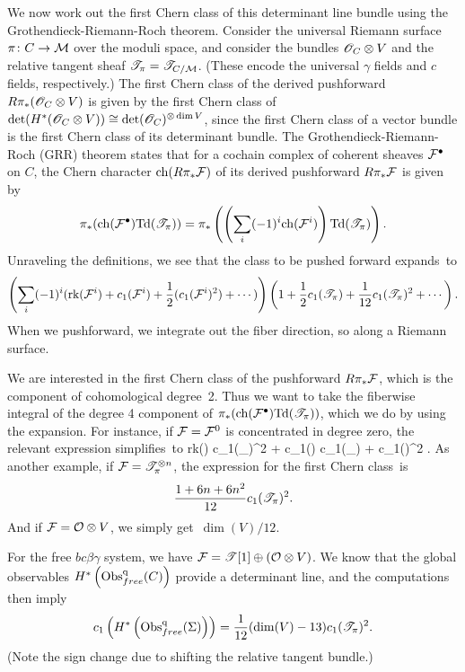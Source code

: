 We now work out the first Chern class of this determinant line bundle using the Grothendieck-Riemann-Roch theorem.
Consider the universal Riemann surface $\pi \colon C \to \mathcal M$ over the moduli space, 
and consider the bundles $\mathscr O_C \otimes V$ and the relative tangent sheaf $\mathscr T_\pi = \mathscr T_{C/\mathcal M}$.
(These encode the universal $\gamma$ fields and $c$ fields, respectively.)
The first Chern class of the derived pushforward $R\pi_*(\mathscr O_C \otimes V)$ is given by the first Chern class of $\det(H^*(\mathscr O_C \otimes V)) \cong \det(\mathscr O_C)^{\otimes \dim V}$, 
since the first Chern class of a vector bundle is the first Chern class of its determinant bundle.
The Grothendieck-Riemann-Roch (GRR) theorem states that for a cochain complex of coherent sheaves $\mathcal F^\bullet$ on $C$, 
the Chern character ${\rm ch}(R\pi_* \mathcal F)$ of its derived pushforward $R\pi_* \mathcal F$  is given by 
\def\Td{{\rm Td}}
\[
\pi_*( \ch(\cF^\bullet)\Td(\sT_\pi)) = \pi_*\left( \left(\sum_{i} (-1)^i \ch (\cF^i) \right) \Td(\sT_\pi)\right).
\]
Unraveling the definitions, we see that the class to be pushed forward expands~to
\[
\left(\sum_i (-1)^i ({\rm rk}(\mathcal F^i) + c_1(\mathcal F^i) + \frac{1}{2}(c_1(\mathcal F^i)^2) + \cdots)\right) \left(1 +\frac{1}{2}c_1(\mathscr T_\pi) + \frac{1}{12} c_1(\mathscr T_\pi)^2 + \cdots \right).
\]
When we pushforward, we integrate out the fiber direction, so along a Riemann surface.


We are interested in the first Chern class of the pushforward $R\pi_* \mathcal F$,
which is the component of cohomological degree~2.
Thus we want to take the fiberwise integral of the degree 4 component of $\pi_*( \ch(\cF^\bullet)\Td(\sT_\pi))$,
which we do by using the expansion.
For instance, if $\mathcal F = \mathcal F^0$ is concentrated in degree zero, the relevant expression simplifies~to
\ben
{} {\rm rk}(\cF) c_1(\sT_\pi)^2 +  c_1(\cF) c_1(\sT_\pi) +  c_1(\cF)^2 .
\een  
As another example, if $\mathcal F = \mathscr T^{\otimes n}_{\pi}$, the expression for the first Chern class~is 
\[
\frac{1 + 6n + 6n^2}{12} c_1(\mathscr T_\pi)^2.
\]
And if $\mathcal F = \mathcal O \otimes V$, we simply get~$\dim(V)/12$. 

For the free $bc\beta\gamma$ system,
we have $\mathcal F = \mathscr T[1] \oplus (\mathcal O \otimes V)$.
We know that the global observables $H^*\left({\rm Obs}^{\rm q}_{free}(C)\right)$ provide a determinant line,
and the computations then imply
\[
c_1\left(H^*\left({\rm Obs}^{\rm q}_{free}(\Sigma)\right)\right) = \frac{1}{12} (\dim(V) - 13) c_1(\mathscr T_\pi)^2 .
\]
(Note the sign change due to shifting the relative tangent bundle.)

